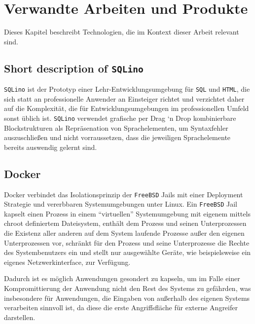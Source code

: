 \section{Verwandte Arbeiten und Produkte}
\label{sec:related-work}

Dieses Kapitel beschreibt Technologien, die im Kontext dieser Arbeit relevant
sind.

\subsection{Short description of \texttt{SQLino}}

\texttt{SQLino} ist der Prototyp einer Lehr-Entwicklungsumgebung für
\texttt{SQL} und \texttt{HTML}, die sich statt an professionelle Anwender an
Einsteiger richtet und verzichtet daher auf die Komplexität, die für
Entwicklungsumgebungen im professionellen Umfeld sonst üblich ist.
\texttt{SQLino} verwendet grafische per Drag `n Drop kombinierbare
Blockstrukturen als Repräsenation von Sprachelementen, um Syntaxfehler
auszuschließen und nicht vorraussetzen, dass die jeweiligen Sprachelemente
bereits auswendig gelernt sind.

\subsection{Docker}
Docker verbindet das Isolationsprinzip der \texttt{FreeBSD} Jails mit einer
Deployment Strategie und vererbbaren Systemumgebungen unter Linux. Ein
\texttt{FreeBSD} Jail kapselt einen Prozess in einem ``virtuellen''
Systemumgebung mit eigenem mittels chroot definiertem Dateisystem, enthält dem
Prozess und seinen Unterprozessen die Existenz aller anderen auf dem System
laufende Prozesse außer den eigenen Unterprozessen vor, schränkt für den Prozess
und seine Unterprozesse die Rechte des Systembenutzers ein und stellt nur
ausgewählte Geräte, wie beispielsweise ein eigenes Netzwerkinterface, zur
Verfügung. \cite{FreeBSD-Jail-doc} \cite{FreeBSD-Jail-developer-comments}
\cite{FreeBSD-Jail-paper}

Dadurch ist es möglich Anwendungen gesondert zu kapseln, um im Falle einer
Kompromittierung der Anwendung nicht den Rest des Systems zu gefährden, was
insbesondere für Anwendungen, die Eingaben von außerhalb des eigenen Systems
verarbeiten sinnvoll ist, da diese die erste Angriffsfläche für externe
Angreifer darstellen.

